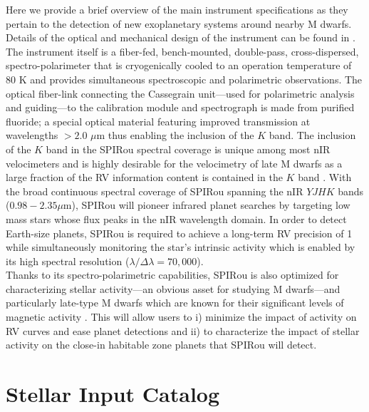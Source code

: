 Here we provide a brief overview of the main instrument specifications as they pertain to the detection of
new exoplanetary systems around nearby M dwarfs.  Details of the optical and mechanical design
of the instrument can be found in \cite{artigau14}. 
The instrument itself is a fiber-fed, bench-mounted, double-pass, cross-dispersed, spectro-polarimeter
that is cryogenically cooled to an operation temperature of 80 K and provides simultaneous spectroscopic and
polarimetric observations. The optical fiber-link connecting the
Cassegrain unit---used for polarimetric analysis and guiding---to the calibration module and spectrograph is made
from purified fluoride; a special optical material featuring improved transmission at wavelengths $>2.0$ $\mu$m thus
enabling the inclusion of the $K$ band. The inclusion of the $K$ band in the SPIRou spectral coverage
is unique among most nIR velocimeters and is highly desirable for the velocimetry of late M dwarfs as
a large fraction of the RV information content is contained in the $K$ band \citep{artigau18}.
With the broad continuous spectral coverage of SPIRou spanning the nIR $YJHK$ bands
($0.98-2.35 \mu$m), SPIRou will pioneer infrared planet searches by targeting low mass stars whose flux
peaks in the nIR wavelength domain. In order to detect Earth-size planets, SPIRou is required to achieve a
long-term RV precision of 1 \mps{} while simultaneously monitoring the star's intrinsic activity which is enabled
by its high spectral resolution ($\lambda/ \Delta \lambda = 70,000$). \\

Thanks to its spectro-polarimetric capabilities, SPIRou is also optimized for characterizing stellar activity---an
obvious asset for studying M dwarfs---and particularly late-type M dwarfs which are known for their significant levels
of magnetic activity \citep{west15}. This will allow users to i) minimize the impact of activity on RV curves and
ease planet detections and ii) to characterize the impact of stellar activity on the close-in habitable zone
planets that SPIRou will detect.


\section{Stellar Input Catalog} \label{BSsect:starsample}
